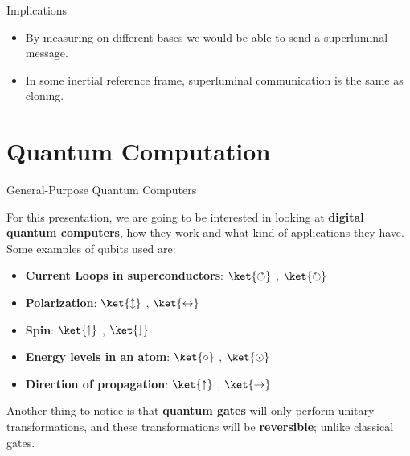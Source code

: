 \documentclass[9pt, handout, aspectratio=169]{beamer}		%
\begin{document}
\begin{frame}{Implications}
		\pause
		
		\begin{itemize}
		\item By measuring on different bases we would be able to send a superluminal message. \pause
		\item In some inertial reference frame, superluminal communication is the same as cloning.
		\end{itemize}

	\end{frame}
	
	
\section{Quantum Computation}	
	
	\begin{frame}{General-Purpose Quantum Computers}
	
		For this presentation, we are going to be interested in looking at \textbf{digital quantum computers}, how they work and what kind of applications they have. Some examples of qubits used are:
		
		\pause
		\vspace{8pt}
		\begin{itemize}
			\item \textbf{Current Loops in superconductors}: $\ket{\circlearrowleft}$ , $\ket{\circlearrowright}$ 
			\item \textbf{Polarization}: $\ket{\updownarrow}$ , $\ket{\leftrightarrow}$ 
			\item \textbf{Spin}: $\ket{\upharpoonleft}$ , $\ket{\downharpoonleft}$ 
			\item \textbf{Energy levels in an atom}: $\ket{\circ}$ , $\ket{\odot}$ 
			\item \textbf{Direction of propagation}: $\ket{\uparrow}$ , $\ket{\rightarrow}$
		\end{itemize}	
		
		\pause
		\vspace{8pt}
		Another thing to notice is that \textbf{quantum gates} will only perform unitary transformations, and these transformations will be \textbf{reversible}; unlike classical gates.
		
	\end{frame}
	
	
\end{document}
